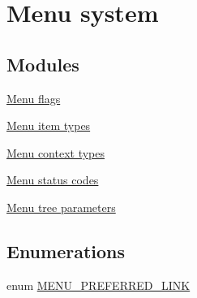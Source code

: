 \hypertarget{group__menu}{
\section{Menu system}
\label{group__menu}
}
\subsection*{Modules}
\begin{DoxyCompactItemize}
\item 
\hyperlink{group__menu__flags}{Menu flags}
\item 
\hyperlink{group__menu__item__types}{Menu item types}
\item 
\hyperlink{group__menu__context__types}{Menu context types}
\item 
\hyperlink{group__menu__status__codes}{Menu status codes}
\item 
\hyperlink{group__menu__tree__parameters}{Menu tree parameters}
\end{DoxyCompactItemize}
\subsection*{Enumerations}
\begin{DoxyCompactItemize}
\item 
enum \hyperlink{group__menu_ga4bc08b83d5906e9acd6f8102993af852}{MENU\_\-PREFERRED\_\-LINK} 
\end{DoxyCompactItemize}
